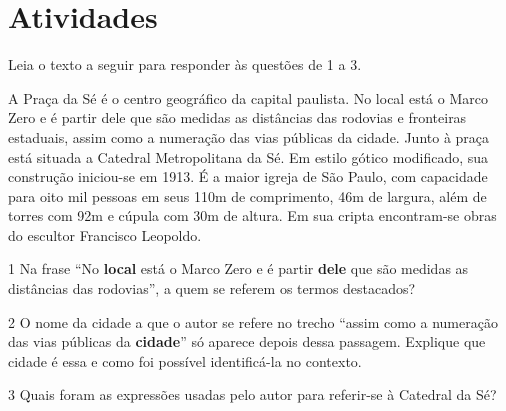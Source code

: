 \section*{Atividades}

Leia o texto a seguir para responder às questões de 1 a 3.

\begin{myquote}

A Praça da Sé é o centro geográfico da capital paulista. No local está o Marco Zero 
e é partir dele que são medidas as distâncias das rodovias e fronteiras estaduais, 
assim como a numeração das vias públicas da cidade. Junto à praça está situada a 
Catedral Metropolitana da Sé. Em estilo gótico modificado, sua construção iniciou-se em 1913.
É a maior igreja de São Paulo, com capacidade para oito mil pessoas em seus 110m de comprimento, 
46m de largura, além de torres com 92m e cúpula com 30m de altura. Em sua cripta encontram-se
obras do escultor Francisco Leopoldo.


\end{myquote}

\num{1} Na frase ``No \textbf{local} está o Marco Zero e é partir \textbf{dele} que são medidas
as distâncias das rodovias'', a quem se referem os termos destacados?


\num{2} O nome da cidade a que o autor se refere no trecho ``assim como a numeração das vias 
públicas da \textbf{cidade}'' só aparece depois dessa passagem. Explique que cidade é essa e
como foi possível identificá-la no contexto.


\num{3} Quais foram as expressões usadas pelo autor para referir-se à Catedral da Sé?


